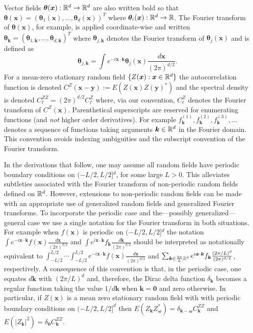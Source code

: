 \documentclass[10pt,noinfoline]{imsart}
\newcommand{\bs}{\boldsymbol}
\begin{document}
Vector fields  $\bs \theta(\bs x):\Bbb R^d\rightarrow \Bbb R^d$ are also written bold so that \mbox{$\bs \theta(\bs x)=(\bs\theta_{1}(\bs x),\ldots, \bs\theta_{d}(\bs x))^T$} where $\bs \theta_i(\bs x):\Bbb R^d\rightarrow \Bbb R$. The Fourier transform of $\bs \theta(\bs x)$, for example, is applied coordinate-wise and written $\bs \theta_{\bs k}=(\bs \theta_{1,\bs k},\ldots, \bs \theta_{d,\bs k})^T$ where $\bs \theta_{j,\bs k}$ denotes the Fourier transform of $\bs \theta_j(\bs x)$ and is defined as
\[
 \bs\theta_{j,\bs k}= \int e^{-i\bs x\cdot \bs k} \bs \theta_{j}(\bs x) \frac{d\bs x}{(2\pi)^{d/2}}.
 \]
For a mean-zero stationary random field $\{Z(\bs x): \bs x\in\Bbb R^d\}$ the autocorrelation function is denoted  $C^Z(\bs x-\bs y) := E(Z(\bs x)Z(\bs y)^*)$ and the spectral density is denoted $C_{\bs\ell}^{ZZ} = {(2\pi)}^{d/2} C_{\bs\ell}^Z$ where, via our convention, $C_{\bs\ell}^Z$ denotes the Fourier transform of $C^Z(\bs x)$.
Parenthetical superscripts are reserved for enumerating functions (and \textit{not} higher order derivatives). For example $f^{(1)}_{\bs k}, f^{(2)}_{\bs k}, f^{(3)}_{\bs k}, \ldots$ denotes a sequence of functions taking arguments $\bs k\in \Bbb R^d$ in the Fourier domain. This convention avoids indexing ambiguities and the subscript convention of the Fourier transform.


In the derivations that follow, one may assume all random fields have periodic boundary conditions on $(-L/2, L/2]{}^d$, for some large $L>0$. This alleviates subtleties associated with the Fourier transform of non-periodic random fields defined on $\Bbb R^d$. However, extensions to non-periodic random fields can be made with an appropriate use of generalized random fields and generalized Fourier transforms. To incorporate the periodic case and the---possibly generalized---general case we use a single notation for the Fourier transform in both situations. For example when  $f(\bs x)$ is periodic on $(-L/2, L/2]{}^d$ the notation $\int e^{-i\bs x\cdot \bs k} f(\bs x)\frac{d\bs x}{(2\pi)^{d/2}}$ and $\int e^{i\bs x\cdot \bs k} f_{\bs k}\frac{d\bs k}{(2\pi)^{d/2}}$ should be interpreted as notationally equivalent to $\int_{-L/2}^{L/2}\cdots\int_{-L/2}^{L/2} e^{-i\bs x\cdot \bs k} f(\bs x)\frac{d\bs x}{(2\pi)^{d/2}}$ and  $\sum_{\bs k \in \frac{2\pi}{L}\Bbb Z^d }   e^{i \bs x\cdot \bs k}  f_{\bs k} \frac{(2\pi/ L){}^{d}}{(2\pi){}^{d/2}} $, respectively. A consequence of this convention is that, in the periodic case, one equates $d\bs k$ with $(2\pi / L)^d$ and, therefore,  the Dirac delta function $\delta_{\bs k}$ becomes a regular function taking the value $1/d\bs k$ when $\bs k=\bs 0$ and zero otherwise. In particular, if $Z(\bs x)$ is a mean zero stationary random field with with periodic boundary conditions on $(-L/2, L/2]^d$ then $E(Z_{\bs k}^{\phantom{*}} Z^{*}_{\bs \omega}) = \delta_{\bs k-\bs \omega}C_{\bs k}^{ZZ}$
and $E(|Z_{\bs k}|^2) = \delta_{\bs 0}C_{\bs k}^{ZZ}$.
\end{document}
